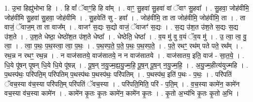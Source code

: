 \documentclass[17pt]{extarticle}
\begin{document}
1. उ॒भा हिह्यु॑भोभा हि । . हि वां᳚ ॅवाꣳ॒॒हि हि वा᳚म् । . वाꣳ॒॒ सु॒हवा॑ सु॒हवा॑ वां ॅवाꣳ सु॒हवा᳚ । . सु॒हवा॒ जोह॑वीमि॒ जोह॑वीमि सु॒हवा॑ सु॒हवा॒ जोह॑वीमि । . सु॒हवेति॑ सु - हवा᳚ । . जोह॑वीमि॒ ता ता जोह॑वीमि॒ जोह॑वीमि॒ ता । . ता वाजं॒ ॅवाज॒म् ता ता वाज᳚म् । . वाजꣳ॑ स॒द्यः स॒द्यो वाजं॒ ॅवाजꣳ॑ स॒द्यः । . स॒द्य उ॑श॒त उ॑श॒ते स॒द्यः स॒द्य उ॑श॒ते । . उ॒श॒ते धेष्ठा॒ धेष्ठो॑श॒त उ॑श॒ते धेष्ठा᳚ । . धेष्ठेति॒ धेष्ठा᳚ । . व॒य मु॑ वु व॒यं ॅव॒य मु॑ । . उ॒ त्वा॒ त्व॒ वु॒ त्वा॒ । . त्वा॒ प॒थः॒ प॒थ॒स्त्वा॒ त्वा॒ प॒थः॒ । . प॒थ॒स्प॒ते॒ प॒ते॒ प॒थः॒ प॒थ॒स्प॒ते॒ । . प॒ते॒ रथꣳ॒॒ रथ॑म् पते पते॒ रथ᳚म् । . रथ॒न्न न रथꣳ॒॒ रथ॒न्न । . न वाज॑सातये॒ वाज॑सातये॒ न न वाज॑सातये । . वाज॑सातय॒ इति॒ वाज॑ - सा॒त॒ये॒ । . धि॒ये पू॑षन् पूषन् धि॒ये धि॒ये पू॑षन्न् । . पू॒ष॒न् न॒यु॒ज्म॒ह्य॒यु॒ज्म॒हि॒ पू॒ष॒न् पू॒ष॒न् न॒यु॒ज्म॒हि॒ । . अ॒यु॒ज्म॒हीत्य॑युज्महि । . प॒थस्प॑थः॒ परि॑पति॒म् परि॑पतिम् प॒थस्प॑थः प॒थस्प॑थः॒ परि॑पतिम् । . प॒थस्प॑थ॒ इति॑ प॒थः - प॒थः॒ । . परि॑पतिं ॅवच॒स्या व॑च॒स्या परि॑पति॒म् परि॑पतिं ॅवच॒स्या । . परि॑पति॒मिति॒ परि॑ - प॒ति॒म् । . व॒च॒स्या कामे॑न॒ कामे॑न वच॒स्या व॑च॒स्या कामे॑न । . कामे॑न कृ॒तः कृ॒तः कामे॑न॒ कामे॑न कृ॒तः । . कृ॒तो अ॒भ्य॑भि कृ॒तः कृ॒तो अ॒भि । \newline
\end{document}
